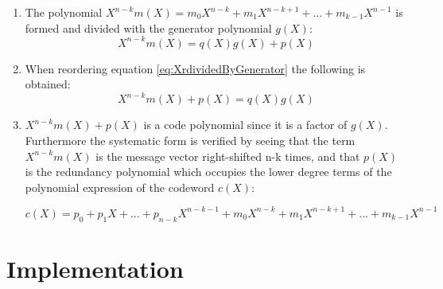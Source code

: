 \documentclass[Main]{subfiles}
\begin{document}
\begin{enumerate}
\item The polynomial $X^{n-k}m(X) = m_0X^{n-k} + m_1X^{n-k+1} + ... +m_{k-1}X^{n-1}$ is formed and divided with the generator polynomial $g(X)$:
\begin{equation} \label{eq:XrdividedByGenerator}
X^{n-k}m(X) = q(X)g(X)+p(X)
\end{equation}

\item When reordering equation \ref{eq:XrdividedByGenerator} the following is obtained:
\begin{equation} \label{eq:XrdividedByGeneratorReoreded}
X^{n-k}m(X)+ p(X)=q(X)g(X)
\end{equation}

\item $X^{n-k}m(X)+p(X)$ is a code polynomial since it is a factor of $g(X)$. Furthermore the systematic form is verified by seeing that the term $X^{n-k}m(X)$ is the message vector right-shifted n-k times, and that $p(X)$ is the redundancy polynomial which occupies the lower degree terms of the polynomial expression of the codeword $c(X)$:

{\centering 
$c(X) = p_0 + p_1X + ... + p_{n-k}X^{n-k-1} + m_0X^{n-k} + m_1X^{n-k+1}+...+m_{k-1}X^{n-1}$ \par}

\end{enumerate}

\section{Implementation}
\end{document}
